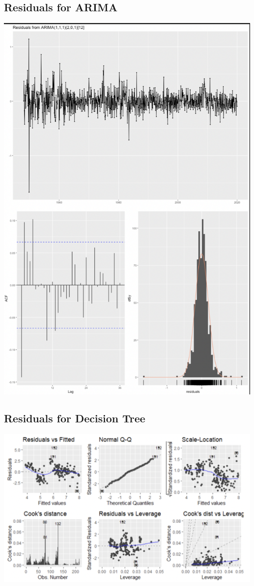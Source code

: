 \documentclass{article}
\begin{document}
	\subsection{Residuals for ARIMA}
	\begin{center}
		\includegraphics[width=1\textwidth]{assets/residual2.png}
	\end{center}
\subsection{Residuals for Decision Tree}
	\begin{center}
		\includegraphics[width=1\textwidth]{assets/residual3.png}
	\end{center}
\end{document}
